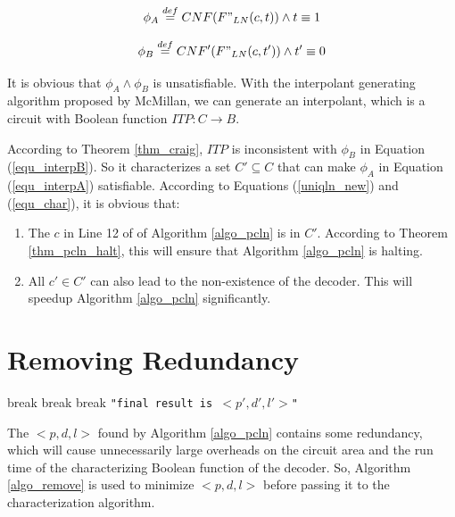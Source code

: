 \documentclass{sig-alternate}
\begin{document}
\begin{equation}\label{equ_interpA}
\phi_A\stackrel{def}{=}CNF(F"_{LN}(c,t))\wedge t\equiv 1
\end{equation}

\begin{equation}\label{equ_interpB}
\phi_B\stackrel{def}{=}CNF'(F"_{LN}(c,t'))\wedge t'\equiv 0
\end{equation}

It is obvious that $\phi_A\wedge \phi_B$ is unsatisfiable.
With the interpolant generating algorithm proposed by McMillan\cite{interp_McMillan},
we can generate an interpolant,
which is a circuit with Boolean function $ITP:C\to B$.

According to Theorem \ref{thm_craig},
$ITP$ is inconsistent with $\phi_B$ in Equation (\ref{equ_interpB}).
So it characterizes a set $C'\subseteq C$ that can make $\phi_A$ in Equation (\ref{equ_interpA}) satisfiable.
According to Equations (\ref{uniqln_new}) and (\ref{equ_char}),
it is obvious that:
\begin{enumerate}
 \item The $c$ in Line 12 of of Algorithm \ref{algo_pcln} is in $C'$.
According to Theorem \ref{thm_pcln_halt},
this will ensure that Algorithm \ref{algo_pcln} is halting.
 \item All $c'\in C'$ can also lead to the non-existence of the decoder.
This will speedup Algorithm \ref{algo_pcln} significantly.
\end{enumerate}

\section{Removing Redundancy}\label{sec_rmred}
\begin{algorithm}
\caption{$RemoveRedundancy(p,d,l,R)$}
\label{algo_remove}
\begin{algorithmic}[1]
    \STATE break
  \ENDIF
\ENDFOR
{}
    \STATE break
  \ENDIF
\ENDFOR
{}
    \STATE break
  \ENDIF
\ENDFOR
\PRINT \texttt{"final result is $<p',d',l'>$"}
\end{algorithmic}
\end{algorithm}

The $<p,d,l>$ found by Algorithm \ref{algo_pcln} contains some redundancy,
which will cause unnecessarily large overheads on the circuit area and the run time of the characterizing Boolean function of the decoder.
So,
Algorithm \ref{algo_remove} is used to minimize $<p,d,l>$ before passing it to the characterization algorithm.
\end{document}
